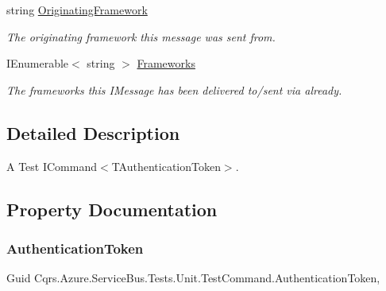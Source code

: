 \begin{DoxyCompactItemize}
string \hyperlink{classCqrs_1_1Azure_1_1ServiceBus_1_1Tests_1_1Unit_1_1TestCommand_a8bea2fea080417034c031252641d88cd_a8bea2fea080417034c031252641d88cd}{Originating\+Framework}
\begin{DoxyCompactList}\small\item\em The originating framework this message was sent from. \end{DoxyCompactList}\item 
I\+Enumerable$<$ string $>$ \hyperlink{classCqrs_1_1Azure_1_1ServiceBus_1_1Tests_1_1Unit_1_1TestCommand_acc509116aa049e8812c964233775d0c6_acc509116aa049e8812c964233775d0c6}{Frameworks}
\begin{DoxyCompactList}\small\item\em The frameworks this I\+Message has been delivered to/sent via already. \end{DoxyCompactList}\end{DoxyCompactItemize}


\subsection{Detailed Description}
A Test I\+Command$<$\+T\+Authentication\+Token$>$. 



\subsection{Property Documentation}
\mbox{\label{classCqrs_1_1Azure_1_1ServiceBus_1_1Tests_1_1Unit_1_1TestCommand_a98a038b33bcbfad2511543326906731c_a98a038b33bcbfad2511543326906731c}} 
\subsubsection{\texorpdfstring{Authentication\+Token}{AuthenticationToken}}
{\footnotesize\ttfamily Guid Cqrs.\+Azure.\+Service\+Bus.\+Tests.\+Unit.\+Test\+Command.\+Authentication\+Token\hspace{0.3cm}{\ttfamily [get]}, {\ttfamily [set]}}




